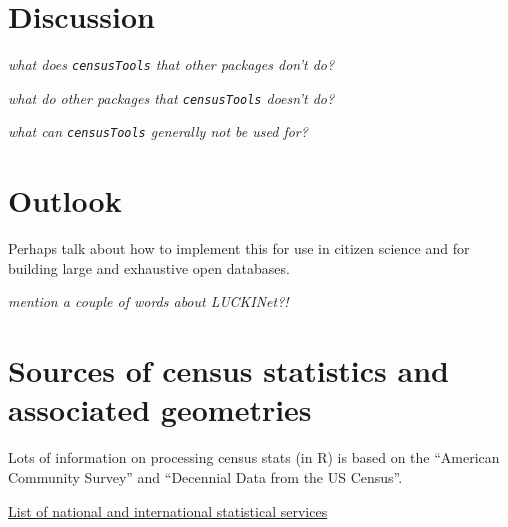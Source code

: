 \documentclass[12pt,]{article}
\begin{document}
\hypertarget{discussion}{%
\section{Discussion}\label{discussion}}

\emph{what does \texttt{censusTools} that other packages don't do?}

\emph{what do other packages that \texttt{censusTools} doesn't do?}

\emph{what can \texttt{censusTools} generally not be used for?}

\hypertarget{outlook}{%
\section{Outlook}\label{outlook}}

Perhaps talk about how to implement this for use in citizen science and for building large and exhaustive open databases.

\emph{mention a couple of words about LUCKINet?!}

\hypertarget{sources-of-census-statistics-and-associated-geometries}{%
\section{Sources of census statistics and associated geometries}\label{sources-of-census-statistics-and-associated-geometries}}

Lots of information on processing census stats (in R) is based on the ``American Community Survey'' and ``Decennial Data from the US Census''.

\href{https://en.wikipedia.org/wiki/List_of_national_and_international_statistical_services}{List of national and international statistical services}
\end{document}
